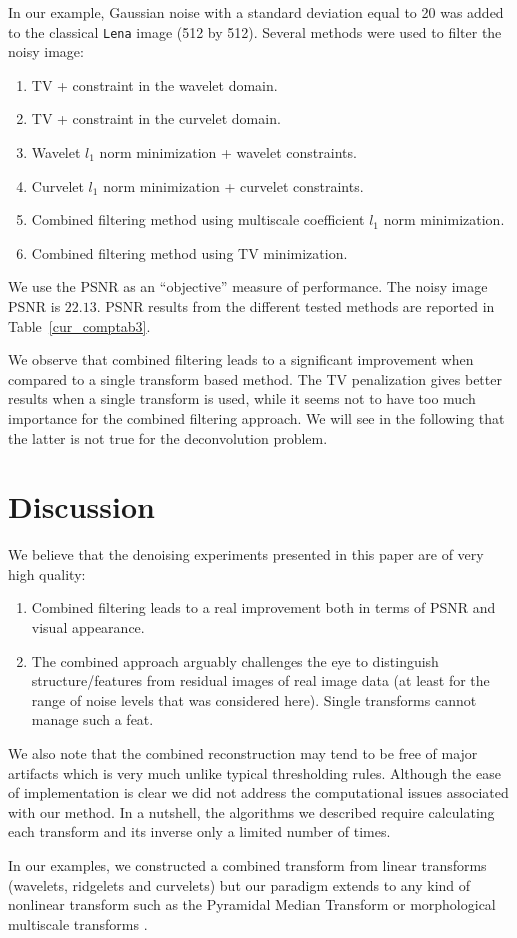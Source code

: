 In our example, Gaussian noise with a standard deviation equal
to 20 was added to the classical {\tt Lena} image (512 by 512).
Several methods were used to filter the noisy image:
\begin{enumerate}
\item TV + constraint in the wavelet domain.
\item TV + constraint in the curvelet domain.
\item Wavelet $l_1$ norm minimization + wavelet constraints.
\item Curvelet $l_1$ norm minimization + curvelet constraints.
\item Combined filtering method using multiscale coefficient $l_1$ 
norm minimization.
\item Combined filtering method using TV minimization.
\end{enumerate}
We use the PSNR as an ``objective'' measure of performance.  
The noisy image PSNR is $22.13$. 
PSNR results from the different tested methods 
are reported in Table~\ref{cur_comptab3}.

We observe that combined filtering leads to a significant improvement
when compared to a single transform based method. 
The TV penalization gives better results when a single transform is used,
while it 
seems not to have too much importance for the combined filtering approach.
We will see in the following that the latter
is not true for the deconvolution problem.

\section{Discussion}
We believe that the denoising experiments presented in this paper are
of very high quality: 
\begin{enumerate}
\item Combined filtering leads to a real
improvement both in terms of PSNR and visual appearance. 
\item The combined approach arguably challenges the eye to distinguish
  structure/features from residual images of real image data (at least
  for the range of noise levels that was considered here). Single
  transforms cannot manage such a feat.  
\end{enumerate}
We also note that the combined reconstruction may tend to be free of
major artifacts which is very much unlike typical thresholding rules.
Although the ease of implementation is clear we did not address the
computational issues associated with our method. In a nutshell, the
algorithms we described require calculating each transform and its
inverse only a limited  number of times. 

In our examples, we constructed a combined transform from linear
transforms (wavelets, ridgelets and curvelets) but our paradigm
extends to any kind of nonlinear transform such as the Pyramidal
Median Transform \cite{starck:book98} or morphological multiscale
transforms \cite{wave:goutsias99b}.


\clearpage
\newpage


